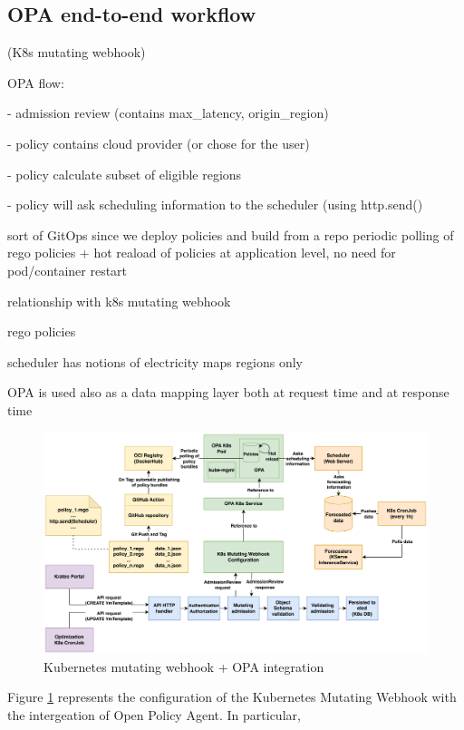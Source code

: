 \subsection{OPA end-to-end workflow}

 (K8s mutating webhook)

OPA flow:

- admission review (contains max\_latency, origin\_region)

- policy contains cloud provider (or chose for the user)

- policy calculate subset of eligible regions

- policy will ask scheduling information to the scheduler (using http.send()




sort of GitOps since we deploy policies and build from a repo
periodic polling of rego policies
+ hot reaload of policies at application level, no need for pod/container restart



relationship with k8s mutating webhook

rego policies


scheduler has notions of 
electricity maps regions only

OPA is used also as a data mapping layer
both at request time
and at response time


\begin{figure}[htb]
\centering
\includegraphics[width=1\linewidth]{images/mutating_webhook+OPA_integration.png}
\caption{Kubernetes mutating webhook + OPA integration}
\label{fig:webhook+opa}
\end{figure}

Figure \ref{fig:webhook+opa} represents the configuration of the Kubernetes Mutating Webhook with the intergeation of Open Policy Agent.
In particular, 




